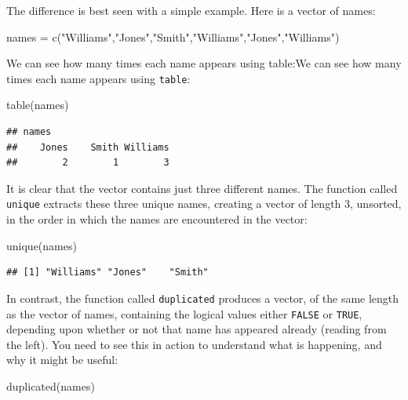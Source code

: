 \documentclass[
]{book}
\newenvironment{Shaded}{\begin{snugshade}}{\end{snugshade}}
\newcommand{\FunctionTok}[1]{\textcolor[rgb]{0.00,0.00,0.00}{#1}}
\newcommand{\NormalTok}[1]{#1}
\newcommand{\OtherTok}[1]{\textcolor[rgb]{0.56,0.35,0.01}{#1}}
\newcommand{\StringTok}[1]{\textcolor[rgb]{0.31,0.60,0.02}{#1}}
\theoremstyle{definition}
\theoremstyle{definition}
\theoremstyle{definition}
\theoremstyle{definition}
\theoremstyle{remark}
\begin{document}
The difference is best seen with a simple example. Here is a vector of names:

\begin{Shaded}
\begin{Highlighting}[]
\NormalTok{names }\OtherTok{=} \FunctionTok{c}\NormalTok{(}\StringTok{"Williams"}\NormalTok{,}\StringTok{"Jones"}\NormalTok{,}\StringTok{"Smith"}\NormalTok{,}\StringTok{"Williams"}\NormalTok{,}\StringTok{"Jones"}\NormalTok{,}\StringTok{"Williams"}\NormalTok{)}
\end{Highlighting}
\end{Shaded}

We can see how many times each name appears using table:We can see how many times each name appears using \texttt{table}:

\begin{Shaded}
\begin{Highlighting}[]
\FunctionTok{table}\NormalTok{(names)}
\end{Highlighting}
\end{Shaded}

\begin{verbatim}
## names
##    Jones    Smith Williams 
##        2        1        3
\end{verbatim}

It is clear that the vector contains just three different names. The function called \texttt{unique} extracts these three unique names, creating a vector of length 3, unsorted, in the order in which the names are encountered in the vector:

\begin{Shaded}
\begin{Highlighting}[]
\FunctionTok{unique}\NormalTok{(names)}
\end{Highlighting}
\end{Shaded}

\begin{verbatim}
## [1] "Williams" "Jones"    "Smith"
\end{verbatim}

In contrast, the function called \texttt{duplicated} produces a vector, of the same length as the vector of names, containing the logical values either \texttt{FALSE} or \texttt{TRUE}, depending upon whether or not that name has appeared already (reading from the left). You need to see this in action to understand what is happening, and why it might be useful:

\begin{Shaded}
\begin{Highlighting}[]
\FunctionTok{duplicated}\NormalTok{(names)}
\end{Highlighting}
\end{Shaded}
\end{document}
